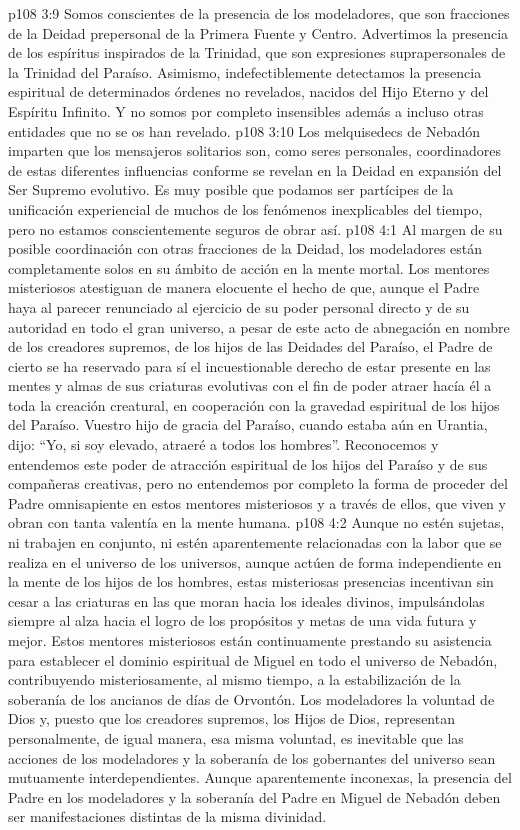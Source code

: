 \vs p108 3:9 Somos conscientes de la presencia de los modeladores, que son fracciones de la Deidad prepersonal de la Primera Fuente y Centro. Advertimos la presencia de los espíritus inspirados de la Trinidad, que son expresiones suprapersonales de la Trinidad del Paraíso. Asimismo, indefectiblemente detectamos la presencia espiritual de determinados órdenes no revelados, nacidos del Hijo Eterno y del Espíritu Infinito. Y no somos por completo insensibles además a incluso otras entidades que no se os han revelado.
\vs p108 3:10 Los melquisedecs de Nebadón imparten que los mensajeros solitarios son, como seres personales, coordinadores de estas diferentes influencias conforme se revelan en la Deidad en expansión del Ser Supremo evolutivo. Es muy posible que podamos ser partícipes de la unificación experiencial de muchos de los fenómenos inexplicables del tiempo, pero no estamos conscientemente seguros de obrar así.
\vs p108 4:1 Al margen de su posible coordinación con otras fracciones de la Deidad, los modeladores están completamente solos en su ámbito de acción en la mente mortal. Los mentores misteriosos atestiguan de manera elocuente el hecho de que, aunque el Padre haya al parecer renunciado al ejercicio de su poder personal directo y de su autoridad en todo el gran universo, a pesar de este acto de abnegación en nombre de los creadores supremos, de los hijos de las Deidades del Paraíso, el Padre de cierto se ha reservado para sí el incuestionable derecho de estar presente en las mentes y almas de sus criaturas evolutivas con el fin de poder atraer hacía él a toda la creación creatural, en cooperación con la gravedad espiritual de los hijos del Paraíso. Vuestro hijo de gracia del Paraíso, cuando estaba aún en Urantia, dijo: “Yo, si soy elevado, atraeré a todos los hombres”. Reconocemos y entendemos este poder de atracción espiritual de los hijos del Paraíso y de sus compañeras creativas, pero no entendemos por completo la forma de proceder del Padre omnisapiente en estos mentores misteriosos y a través de ellos, que viven y obran con tanta valentía en la mente humana.
\vs p108 4:2 Aunque no estén sujetas, ni trabajen en conjunto, ni estén aparentemente relacionadas con la labor que se realiza en el universo de los universos, aunque actúen de forma independiente en la mente de los hijos de los hombres, estas misteriosas presencias incentivan sin cesar a las criaturas en las que moran hacia los ideales divinos, impulsándolas siempre al alza hacia el logro de los propósitos y metas de una vida futura y mejor. Estos mentores misteriosos están continuamente prestando su asistencia para establecer el dominio espiritual de Miguel en todo el universo de Nebadón, contribuyendo misteriosamente, al mismo tiempo, a la estabilización de la soberanía de los ancianos de días de Orvontón. Los modeladores  la voluntad de Dios y, puesto que los creadores supremos, los Hijos de Dios, representan personalmente, de igual manera, esa misma voluntad, es inevitable que las acciones de los modeladores y la soberanía de los gobernantes del universo sean mutuamente interdependientes. Aunque aparentemente inconexas, la presencia del Padre en los modeladores y la soberanía del Padre en Miguel de Nebadón deben ser manifestaciones distintas de la misma divinidad.
